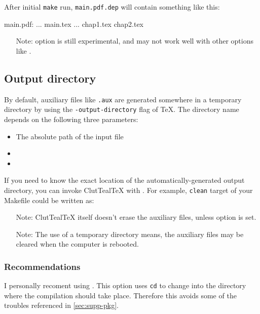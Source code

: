 \documentclass[a4paper, 11pt]{scrartcl}
\let\TeXold\TeX
\newcommand\CluttealTeX{ClutTeal\TeX\xspace}
\renewcommand\TeX{\TeXold\xspace}
\begin{document}
After initial \texttt{make} run, \texttt{main.pdf.dep} will contain something like this:
\begin{boxcode}[make]
main.pdf: ... main.tex ... chap1.tex chap2.tex
\end{boxcode}

\begin{itemize}
	\item[Note:]  option is still experimental, and may not work well with other options like .
\end{itemize}

\subsection{Output directory} \label{sec:output-dir}
By default, auxiliary files like \texttt{.aux} are generated somewhere in a temporary directory by using the \texttt{-output-directory} flag of \TeX.
The directory name depends on the following three parameters:
\begin{itemize}
	\item The absolute path of the input file
	\item {}
	\item {}
\end{itemize}

If you need to know the exact location of the automatically-generated output directory, you can invoke \CluttealTeX with .
For example, \texttt{clean} target of your Makefile could be written as:

\begin{itemize}
	\item[Note:] \CluttealTeX itself doesn't erase the auxiliary files, unless  option is set.
	\item[Note:] The use of a temporary directory means, the auxiliary files may be cleared when the computer is rebooted.
\end{itemize}

\subsubsection{Recommendations}
I personally recoment using .
This option uses \texttt{cd} to change into the directory where the compilation should take place.
Therefore this avoids some of the troubles referenced in \cref{sec:supp-pkg}.
\end{document}
